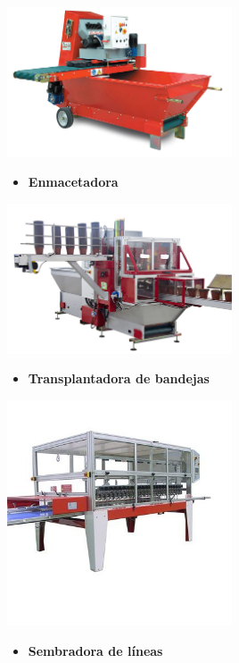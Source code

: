 \documentclass[a4paper,12pt,oneside]{article}
\begin{document}
\begin{center}
\includegraphics[width=0.5\textwidth]{./img_uf1596/bandejas_mezcladora.jpg}
\end{center} 
\begin{itemize}
\item \textbf{Enmacetadora}
\end{itemize}
\begin{center}
\includegraphics[width=0.5\textwidth]{./img_uf1596/enmacetadora.jpg}
\end{center}
\begin{itemize}
\item \textbf{Transplantadora de bandejas}
\end{itemize}
\begin{center}
\includegraphics[width=0.5\textwidth]{./img_uf1596/transplantadora_bandejas.jpg}
\end{center}
\begin{itemize}
\item \textbf{Sembradora de líneas}
\end{itemize}
\end{document}
